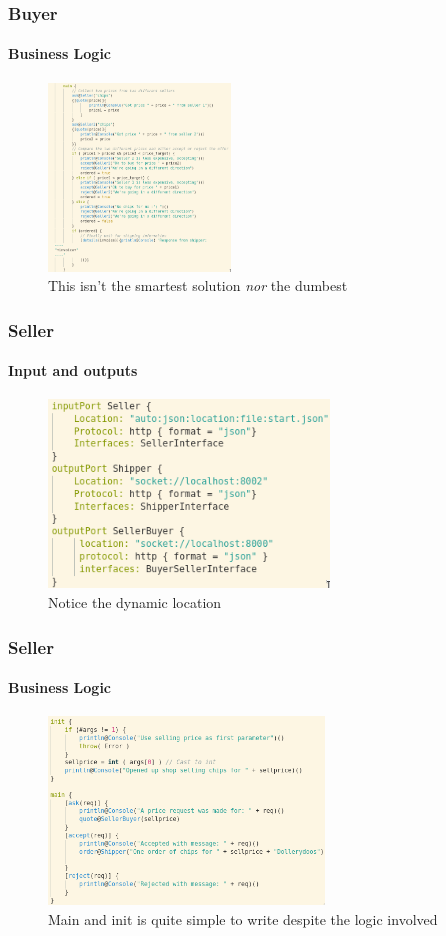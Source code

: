 \documentclass{beamer}
\begin{document}
    \begin{frame}[t]
        \frametitle{Buyer}
        \framesubtitle{Business Logic}
\begin{figure}[!h]
    \centering
    \includegraphics[height=5cm]{images2/buyerlogic.png}
    \caption{This isn't the smartest solution \emph{nor} the dumbest}
    \label{fig:a2p1}
\end{figure}
    \end{frame}

    \begin{frame}[t]
        \frametitle{Seller}
        \framesubtitle{Input and outputs}
\begin{figure}[!h]
    \centering
    \includegraphics[height=5cm]{images2/sellerio.png}
    \caption{Notice the dynamic location}
    \label{fig:a2p2}
\end{figure}
    \end{frame}
    \begin{frame}[t]
        \frametitle{Seller}
        \framesubtitle{Business Logic}
\begin{figure}[!h]
    \centering
    \includegraphics[height=5cm]{images2/sellerlogic.png}
    \caption{Main and init is quite simple to write despite the logic involved}
    \label{fig:a2p2}
\end{figure}
    \end{frame}
\end{document}
